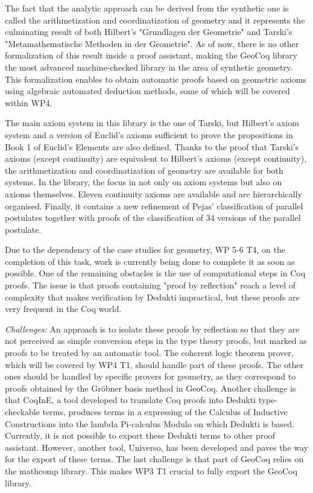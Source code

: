 The fact that the analytic approach can be derived from the synthetic
one is called the arithmetization and coordinatization of geometry and
it represents the culminating result of both Hilbert's "Grundlagen der
Geometrie" and Tarski's "Metamathematische Methoden in der
Geometrie". As of now, there is no other formalization of this result
inside a proof assistant, making the GeoCoq library the most advanced
machine-checked library in the area of synthetic geometry. This
formalization enables to obtain automatic proofs based on geometric
axioms using algebraic automated deduction methods, some of which will
be covered within WP4.

The main axiom system in this library is the one of Tarski, but
Hilbert's axiom system and a version of Euclid's axioms sufficient to
prove the propositions in Book 1 of Euclid's Elements are also
defined. Thanks to the proof that Tarski's axioms (except continuity)
are equivalent to Hilbert's axioms (except continuity), the
arithmetization and coordinatization of geometry are available for
both systems. In the library, the focus in not only on axiom systems
but also on axioms themselves. Eleven continuity axioms are available
and are hierarchically organised. Finally, it contains a new
refinement of Pejas' classification of parallel postulates together
with proofs of the classification of 34 versions of the parallel
postulate.

Due to the dependency of the case studies for geometry, WP 5-6 T4, on
the completion of this task, work is currently being done to complete
it as soon as possible. One of the remaining obstacles is the use of
computational steps in Coq proofs. The issue is that proofs containing
"proof by reflection" reach a level of complexity that makes
verification by Dedukti impractical, but these proofs are very
frequent in the Coq world.

\emph{Challenges:}
An approach is to isolate these proofs by reflection so that they are not perceived as simple conversion steps in the type theory proofs, but marked as proofs to be treated by an automatic tool. The coherent logic theorem prover, which will be covered by WP4 T1, should handle part of these proofs. The other ones should be handled by specific provers for geometry, as they correspond to proofs obtained by the Gr\"obner basis method in GeoCoq.
Another challenge is that CoqInE, a tool developed to translate Coq proofs into Dedukti type-checkable terms, produces terms in a expressing of the Calculus of Inductive Constructions into the lambda Pi-calculus Modulo on which Dedukti is based. Currently, it is not possible to export these Dedukti terms to other proof assistant. However, another tool, Universo, has been developed and paves the way for the export of these terms.
The last challenge is that part of GeoCoq relies on the mathcomp library. This makes WP3 T1 crucial to fully export the GeoCoq library.


